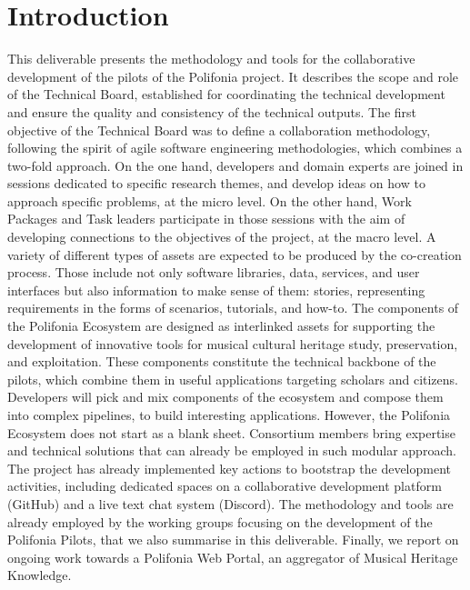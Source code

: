 \chapter{Introduction}\label{ch:introduction}
This deliverable presents the methodology and tools for the collaborative development of the pilots of the Polifonia project. 
It describes the scope and role of the Technical Board, established for coordinating the technical development and ensure the quality and consistency of the technical outputs. 
The first objective of the Technical Board was to define a collaboration methodology, following the spirit of agile software engineering methodologies, which combines a two-fold approach. 
On the one hand, developers and domain experts are joined in sessions dedicated to specific research themes, and develop ideas on how to approach specific problems, at the micro level. 
On the other hand, Work Packages and Task leaders participate in those sessions with the aim of developing connections to the objectives of the project, at the macro level. 
A variety of different types of assets are expected to be produced by the co-creation process. 
Those include not only software libraries, data, services, and user interfaces but also information to make sense of them: stories, representing requirements in the forms of scenarios, tutorials, and how-to. 
The components of the Polifonia Ecosystem are designed as interlinked assets for supporting the development of innovative tools for musical cultural heritage study, preservation, and exploitation. 
These components constitute the technical backbone of the pilots, which combine them in useful applications targeting scholars and citizens. 
Developers will pick and mix components of the ecosystem and compose them into complex pipelines, to build interesting applications. 
However, the Polifonia Ecosystem does not start as a blank sheet. 
Consortium members bring expertise and technical solutions that can already be employed in such modular approach. %
The project has already implemented key actions to bootstrap the development activities, including dedicated spaces on a collaborative development platform (GitHub) and a live text chat system (Discord). 
The methodology and tools are already employed by the working groups focusing on the development of the Polifonia Pilots, that we also summarise in this deliverable. 
Finally, we report on ongoing work towards a Polifonia Web Portal, an aggregator of Musical Heritage Knowledge.

